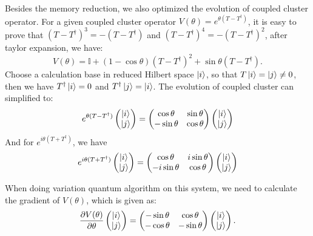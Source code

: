 Besides the memory reduction, we also optimized the evolution of coupled cluster operator. For a given coupled cluster operator $V(\theta)=e^{\theta(T-T^\dagger)}$, it is easy to prove that $(T-T^\dagger)^3 = - (T-T^\dagger)$ and $(T-T^\dagger)^4 = -(T-T^\dagger)^2$, after taylor expansion, we have:
\begin{equation}
    V(\theta) = \mathbb{I} + ( 1-\cos\theta)(T-T^\dagger)^2 + \sin\theta (T-T^\dagger).
\end{equation}
Choose a calculation base in reduced Hilbert space $\ket{i}$, so that $T\ket{i} = \ket{j}\neq0$, then we have $T^\dagger\ket{i}=0$ and $T^\dagger\ket{j}=\ket{i}$. The evolution of coupled cluster can simplified to:
\begin{equation}
    e^{\theta(T-T^\dagger)}\begin{pmatrix}
        \ket{i} \\\ket{j}
    \end{pmatrix}=\begin{pmatrix}
        \cos\theta  & \sin\theta \\
        -\sin\theta & \cos\theta
    \end{pmatrix}\begin{pmatrix}
        \ket{i} \\\ket{j}
    \end{pmatrix}
\end{equation}
And for $e^{i\theta(T+T^\dagger)}$, we have
\begin{equation}
    e^{i\theta(T+T^\dagger)}\begin{pmatrix}
        \ket{i} \\\ket{j}
    \end{pmatrix}=\begin{pmatrix}
        \cos\theta   & i\sin\theta \\
        -i\sin\theta & \cos\theta
    \end{pmatrix}\begin{pmatrix}
        \ket{i} \\\ket{j}
    \end{pmatrix}
\end{equation}

When doing variation quantum algorithm on this system, we need to calculate the gradient of $V(\theta)$, which is given as:
\begin{equation}
    \frac{\partial V(\theta)}{\partial\theta}\begin{pmatrix}
        \ket{i} \\\ket{j}
    \end{pmatrix}=\begin{pmatrix}
        -\sin\theta  & \cos\theta \\
        -\cos\theta & -\sin\theta
    \end{pmatrix}\begin{pmatrix}
        \ket{i} \\\ket{j}
    \end{pmatrix}.
\end{equation}
